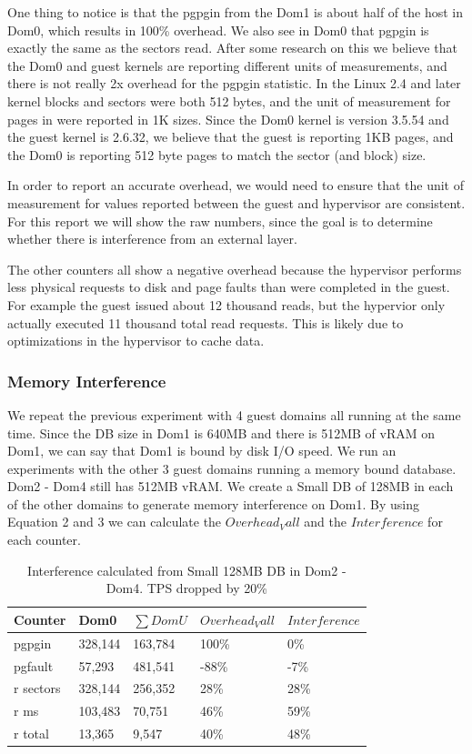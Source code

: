 One thing to notice is that the pgpgin from the Dom1 is about half of the host in Dom0, which results in 100\% overhead.  
We also see in Dom0 that pgpgin is exactly the same as the sectors read.  
After some research on this we believe that the Dom0 and guest kernels are reporting different units of measurements, and there is not really 2x overhead for the pgpgin statistic.  
In the Linux 2.4 and later kernel blocks and sectors were both 512 bytes, and the unit of measurement for pages in were reported in 1K sizes.  Since the Dom0 kernel is version 3.5.54 and the guest kernel is 2.6.32, we believe that the guest is reporting 1KB pages, and the Dom0 is reporting 512 byte pages to match the sector (and block) size. 

In order to report an accurate overhead, we would need to ensure that the unit of measurement for values reported between the guest and hypervisor are consistent.  For this report we will show the raw numbers, since the goal is to determine whether there is interference from an external layer. 

The other counters all show a negative overhead because the hypervisor performs less physical requests to disk and page faults than were completed in the guest.  For example the guest issued about 12 thousand reads, but the hypervior only actually executed 11 thousand total read requests.  This is likely due to optimizations in the hypervisor to cache data.

\subsubsection{Memory Interference}
We repeat the previous experiment with 4 guest domains all running at the same time.
Since the DB size in Dom1 is 640MB and there is 512MB of vRAM on Dom1, we can say that Dom1 is bound by disk I/O speed.
We run an experiments with the other 3 guest domains running a memory bound database.  Dom2 - Dom4 still has 512MB vRAM.  
We create a Small DB of 128MB in each of the other domains to generate memory interference on Dom1.
By using Equation 2 and 3 we can calculate the $Overhead_Vall$ and the $Interference$ for each counter.

\begin{table}[h]
\begin{tabular}{ l l l l p{5cm} }
  Counter & Dom0 & $\sum{DomU}$ & $Overhead_Vall$ & $Interference$ \\
  \hline
	pgpgin    & 328,144 & 163,784 & 100\% &   0\% \\
	pgfault   &  57,293 & 481,541 & -88\% &  -7\% \\
	r sectors & 328,144 & 256,352 &  28\% &  28\% \\
	r ms      & 103,483 &  70,751 &  46\% &  59\% \\
	r total   &  13,365 &   9,547 &  40\% &  48\% \\
  \hline
\end{tabular}
\caption{Interference calculated from Small 128MB DB in Dom2 - Dom4.  TPS dropped by 20\%} 
\label{fig:InterferenceSm}
\end{table}

